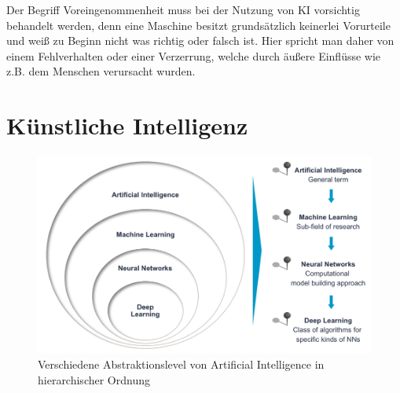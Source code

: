 \documentclass[12pt,oneside,a4paper,parskip]{scrbook}
\begin{document}
Der Begriff Voreingenommenheit muss bei der Nutzung von KI vorsichtig behandelt werden, denn eine Maschine besitzt grundsätzlich keinerlei Vorurteile und weiß zu Beginn nicht was richtig oder falsch ist. Hier spricht man daher von einem Fehlverhalten oder einer Verzerrung, welche durch äußere Einflüsse wie z.B. dem Menschen verursacht wurden.\\


\section{Künstliche Intelligenz}

\begin{figure}[ht]
	\begin{center}
		\includegraphics[width=12cm]{Bilder/Abstraktionslevel_von_AI.jpg}
		\caption{Verschiedene Abstraktionslevel von Artificial Intelligence in hierarchischer Ordnung}
		\label{fig:overview}
	\end{center}
\end{figure}
\end{document}
